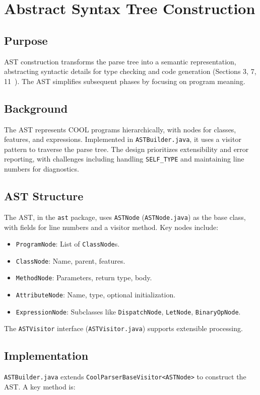\documentclass[11pt, titlepage]{article}
\begin{document}
\section{Abstract Syntax Tree Construction}
\label{sec:ast}

\subsection{Purpose}
AST construction transforms the parse tree into a semantic representation, abstracting syntactic details for type checking and code generation (Sections 3, 7, 11~\cite{cool_manual}). The AST simplifies subsequent phases by focusing on program meaning.

\subsection{Background}
The AST represents COOL programs hierarchically, with nodes for classes, features, and expressions. Implemented in \texttt{ASTBuilder.java}, it uses a visitor pattern to traverse the parse tree. The design prioritizes extensibility and error reporting, with challenges including handling \texttt{SELF\_TYPE} and maintaining line numbers for diagnostics.

\subsection{AST Structure}
The AST, in the \texttt{ast} package, uses \texttt{ASTNode} (\texttt{ASTNode.java}) as the base class, with fields for line numbers and a visitor method. Key nodes include:
\begin{itemize}[leftmargin=*]
    \item \texttt{ProgramNode}: List of \texttt{ClassNode}s.
    \item \texttt{ClassNode}: Name, parent, features.
    \item \texttt{MethodNode}: Parameters, return type, body.
    \item \texttt{AttributeNode}: Name, type, optional initialization.
    \item \texttt{ExpressionNode}: Subclasses like \texttt{DispatchNode}, \texttt{LetNode}, \texttt{BinaryOpNode}.
\end{itemize}

The \texttt{ASTVisitor} interface (\texttt{ASTVisitor.java}) supports extensible processing.

\subsection{Implementation}
\texttt{ASTBuilder.java} extends \texttt{CoolParserBaseVisitor<ASTNode>} to construct the AST. A key method is:
\end{document}
